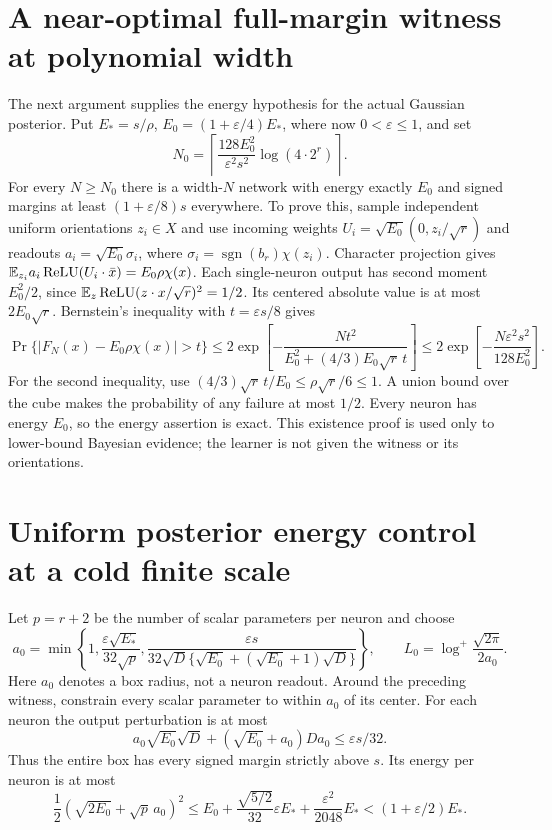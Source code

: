 \section{A near-optimal full-margin witness at polynomial width}
The next argument supplies the energy hypothesis for the actual Gaussian
posterior. Put $E_*=s/\rho$, $E_0=(1+\varepsilon/4)E_*$, where now
$0<\varepsilon\le1$, and set
\[
 N_0=\left\lceil\frac{128E_0^2}{\varepsilon^2s^2}
                                  \log(4\cdot2^r)\right\rceil.
 \tag{13}
\]
For every $N\ge N_0$ there is a width-$N$ network with energy exactly
$E_0$ and signed margins at least $(1+\varepsilon/8)s$ everywhere.
To prove this, sample independent uniform orientations $z_i\in X$ and
use incoming weights $U_i=\sqrt{E_0}(0,z_i/\sqrt r)$ and readouts
$a_i=\sqrt{E_0}\sigma_i$, where
$\sigma_i=\operatorname{sgn}(b_r)\chi(z_i)$.
Character projection gives $\mathbb E_{z_i}a_i\operatorname{ReLU}(U_i\cdot\bar x)
=E_0\rho\chi(x)$.
Each single-neuron output has second moment $E_0^2/2$, since
$\mathbb E_z\operatorname{ReLU}(z\cdot x/\sqrt r)^2=1/2$.
Its centered absolute value is at most $2E_0\sqrt r$.
Bernstein's inequality with $t=\varepsilon s/8$ gives
\[
 \Pr\{|F_N(x)-E_0\rho\chi(x)|>t\}
 \le2\exp\left[-\frac{Nt^2}{E_0^2+(4/3)E_0\sqrt r\,t}\right]
 \le2\exp\left[-\frac{N\varepsilon^2s^2}{128E_0^2}\right].
\]
For the second inequality, use
$(4/3)\sqrt r\,t/E_0\le\rho\sqrt r/6\le1$.
A union bound over the cube makes the probability of any failure at most
$1/2$. Every neuron has energy $E_0$, so the energy assertion is exact.
This existence proof is used only to lower-bound Bayesian evidence; the
learner is not given the witness or its orientations.

\section{Uniform posterior energy control at a cold finite scale}
Let $p=r+2$ be the number of scalar parameters per neuron and choose
\[
 a_0=\min\left\{1,\frac{\varepsilon\sqrt{E_*}}{32\sqrt p},
 \frac{\varepsilon s}
 {32\sqrt D\{\sqrt{E_0}+(\sqrt{E_0}+1)\sqrt D\}}\right\},
 \qquad L_0=\log^+\frac{\sqrt{2\pi}}{2a_0}.             \tag{14}
\]
Here $a_0$ denotes a box radius, not a neuron readout.
Around the preceding witness, constrain every scalar parameter to within
$a_0$ of its center. For each neuron the output perturbation is at most
\[
 a_0\sqrt{E_0}\sqrt D+(\sqrt{E_0}+a_0)Da_0
                                                    \le\varepsilon s/32.
\]
Thus the entire box has every signed margin strictly above $s$.
Its energy per neuron is at most
\[
 \frac12(\sqrt{2E_0}+\sqrt p\,a_0)^2
 \le E_0+\frac{\sqrt{5/2}}{32}\varepsilon E_*
                      +\frac{\varepsilon^2}{2048}E_*
 <(1+\varepsilon/2)E_* .                              \tag{15}
\]

